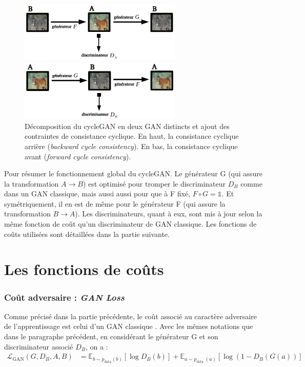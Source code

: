 \begin{figure}[!h]
\centering
\includegraphics[width=220pt]{"images/cycle/cycleBack"}

\vspace{6mm}

\includegraphics[width=220pt]{"images/cycle/cycleFor"}
\caption{Décomposition du cycleGAN en deux GAN distincts et ajout des contraintes de consistance cyclique. En haut, la consistance cyclique arrière (\textit{backward cycle consistency}). En bas, la consistance cyclique avant (\textit{forward cycle consistency}).}
\label{cycleForBack}
\end{figure}

Pour résumer le fonctionnement global du cycleGAN. Le générateur G (qui assure la transformation $ A \rightarrow B $) est optimisé pour tromper le discriminateur $ D_B $ comme dans un GAN classique, mais aussi aussi pour que à F fixé, $ F \circ G = \mathbb{1} $. Et symétriquement, il en est de même pour le générateur F (qui assure la transformation $ B \rightarrow A $). Les discriminateurs, quant à eux, sont mis à jour selon la même fonction de coût qu'un discriminateur de GAN classique. Les fonctions de coûts utilisées sont détaillées dans la partie suivante.


\section{Les fonctions de coûts}

\subsubsection{Coût adversaire : \textit{GAN Loss}}

Comme précisé dans la partie précédente, le coût associé au caractère adversaire de l'apprentissage est celui d'un GAN classique \cite{goodfellow_nips_2016}. Avec les mêmes notations que dans le paragraphe précédent, en considérant le générateur G et son discriminateur associé $D_B$, on a :
$$\begin{aligned}
\mathcal{L}_{\mathrm{GAN}}\left(G, D_{B}, A, B\right) &=\mathbb{E}_{b \sim p_{\mathrm{data}}(b)}\left[\log D_{B}(b)\right] +\mathbb{E}_{a \sim p_{\text {data }}(a)}\left[\log \left(1-D_{B}(G(a))\right]\right.
\end{aligned}$$

